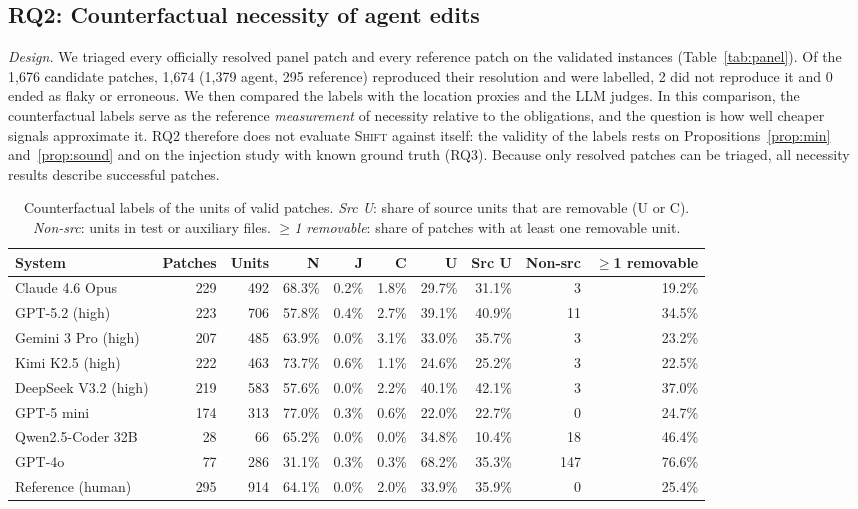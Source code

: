 \documentclass[a4paper,fleqn]{cas-sc}
\newcommand{\tool}{\textsc{Shift}}
\newcommand{\lab}[1]{\textsf{#1}}
\newcommand{\nAgentValid}{1{,}379}
\newcommand{\nCandidates}{1{,}676}
\newcommand{\nGoldValid}{295}
\newcommand{\nNotValid}{2}
\newcommand{\nOtherStatus}{0}
\newcommand{\nValidPatches}{1{,}674}
\begin{document}
\subsection{RQ2: Counterfactual necessity of agent edits}\label{sec:rq2}
\emph{Design.} We triaged every officially resolved panel patch and every reference patch on the validated instances (Table~\ref{tab:panel}). Of the \nCandidates{} candidate patches, \nValidPatches{} (\nAgentValid{} agent, \nGoldValid{} reference) reproduced their resolution and were labelled, \nNotValid{} did not reproduce it and \nOtherStatus{} ended as flaky or erroneous. We then compared the labels with the location proxies and the LLM judges. In this comparison, the counterfactual labels serve as the reference \emph{measurement} of necessity relative to the obligations, and the question is how well cheaper signals approximate it. RQ2 therefore does not evaluate \tool{} against itself: the validity of the labels rests on Propositions~\ref{prop:min} and~\ref{prop:sound} and on the injection study with known ground truth (RQ3). Because only resolved patches can be triaged, all necessity results describe successful patches.

\begin{table}[t]
\caption{Counterfactual labels of the units of valid patches. \emph{Src U}: share of source units that are removable (\lab{U} or \lab{C}). \emph{Non-src}: units in test or auxiliary files. \emph{$\geq$1 removable}: share of patches with at least one removable unit.}
\label{tab:labels}
\centering\footnotesize
\begin{tabular}{lrrrrrrrrr}
\toprule
System & Patches & Units & \lab{N} & \lab{J} & \lab{C} & \lab{U} & Src U & Non-src & $\geq$1 removable \\
\midrule
Claude 4.6 Opus & 229 & 492 & 68.3\% & 0.2\% & 1.8\% & 29.7\% & 31.1\% & 3 & 19.2\% \\
GPT-5.2 (high) & 223 & 706 & 57.8\% & 0.4\% & 2.7\% & 39.1\% & 40.9\% & 11 & 34.5\% \\
Gemini 3 Pro (high) & 207 & 485 & 63.9\% & 0.0\% & 3.1\% & 33.0\% & 35.7\% & 3 & 23.2\% \\
Kimi K2.5 (high) & 222 & 463 & 73.7\% & 0.6\% & 1.1\% & 24.6\% & 25.2\% & 3 & 22.5\% \\
DeepSeek V3.2 (high) & 219 & 583 & 57.6\% & 0.0\% & 2.2\% & 40.1\% & 42.1\% & 3 & 37.0\% \\
GPT-5 mini & 174 & 313 & 77.0\% & 0.3\% & 0.6\% & 22.0\% & 22.7\% & 0 & 24.7\% \\
Qwen2.5-Coder 32B & 28 & 66 & 65.2\% & 0.0\% & 0.0\% & 34.8\% & 10.4\% & 18 & 46.4\% \\
GPT-4o & 77 & 286 & 31.1\% & 0.3\% & 0.3\% & 68.2\% & 35.3\% & 147 & 76.6\% \\
Reference (human) & 295 & 914 & 64.1\% & 0.0\% & 2.0\% & 33.9\% & 35.9\% & 0 & 25.4\% \\
\bottomrule
\end{tabular}
\end{table}
\end{document}
